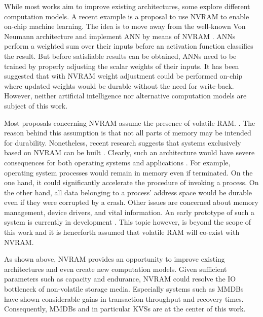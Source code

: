 While most works aim to improve existing architectures, some explore different
computation models. A recent example is a proposal to use \ac{NVRAM} to enable
on-chip machine learning. The idea is to move away from the well-known Von
Neumann architecture and implement \ac{ANN} by means of \ac{NVRAM}
\cite{fumarola2016accelerating}. \acp{ANN} perform a weighted sum over their
inputs before an activation function classifies the result. But before
satisfiable results can be obtained, \acp{ANN} need to be trained by properly
adjusting the scalar weights of their inputs. It has been suggested that with
\ac{NVRAM} weight adjustment could be performed on-chip where updated weights
would be durable without the need for write-back. However, neither artificial
intelligence nor alternative computation models are subject of this work.

Most proposals concerning \ac{NVRAM} assume the presence of volatile \ac{RAM}.
\cite{oukid2017data}. The reason behind this assumption is that not all parts of
memory may be intended for durability. Nonetheless, recent research suggests
that systems exclusively based on \ac{NVRAM} can be built
\cite{narayanan2012whole, courtland2016can}. Clearly, such an architecture would
have severe consequences for both operating systems and applications
\cite{bailey2011operating}. For example, operating system processes would remain
in memory even if terminated. On the one hand, it could significantly accelerate
the procedure of invoking a process. On the other hand, all data belonging to a
process' address space would be durable even if they were corrupted by a crash.
Other issues are concerned about memory management, device drivers, and vital
information. An early prototype of such a system is currently in development
\cite{courtland2016can}. This topic however, is beyond the scope of this work
and it is henceforth assumed that volatile \ac{RAM} will co-exist with
\ac{NVRAM}.

As shown above, \ac{NVRAM} provides an opportunity to improve existing
architectures and even create new computation models. Given sufficient
parameters such as capacity and endurance, \ac{NVRAM} could resolve the \ac{IO}
bottleneck of non-volatile storage media. Especially systems such as \acp{MMDB}
have shown considerable gains in transaction throughput and recovery times.
Consequently, \acp{MMDB} and in particular \acp{KVS} are at the center of this
work.
